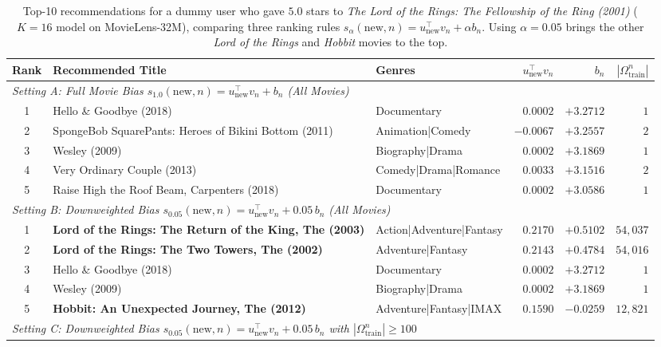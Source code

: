 \documentclass{article}
\theoremstyle{plain}
\theoremstyle{definition}
\begin{document}
\begin{table}[t]
\caption{Top-10 recommendations for a dummy user who gave $5.0$ stars to \emph{The Lord of the Rings: The Fellowship of the Ring (2001)} ($K=16$ model on MovieLens-32M), comparing three ranking rules $s_\alpha(\text{new}, n) = u_{\text{new}}^\top v_n + \alpha b_n$. Using $\alpha=0.05$ brings the other \emph{Lord of the Rings} and \emph{Hobbit} movies to the top.}
\label{tab:dummy_user_lotr}
\vskip 0.1in
\begin{center}
\begin{small}
\setlength{\tabcolsep}{4pt}
\begin{tabular}{cllrrr}
\toprule
\textbf{Rank} & \textbf{Recommended Title} & \textbf{Genres} & $u_{\text{new}}^\top v_n$ & $b_n$ & $|\Omega_{\text{train}}^n|$ \\
\midrule
\multicolumn{6}{l}{\emph{Setting A: Full Movie Bias $s_{1.0}(\text{new}, n) = u_{\text{new}}^\top v_n + b_n$ (All Movies)}} \\
1 & Hello \& Goodbye (2018) & Documentary & $0.0002$ & $+3.2712$ & $1$ \\
2 & SpongeBob SquarePants: Heroes of Bikini Bottom (2011) & Animation|Comedy & $-0.0067$ & $+3.2557$ & $2$ \\
3 & Wesley (2009) & Biography|Drama & $0.0002$ & $+3.1869$ & $1$ \\
4 & Very Ordinary Couple (2013) & Comedy|Drama|Romance & $0.0033$ & $+3.1516$ & $2$ \\
5 & Raise High the Roof Beam, Carpenters (2018) & Documentary & $0.0002$ & $+3.0586$ & $1$ \\
\midrule
\multicolumn{6}{l}{\emph{Setting B: Downweighted Bias $s_{0.05}(\text{new}, n) = u_{\text{new}}^\top v_n + 0.05\,b_n$ (All Movies)}} \\
1 & \textbf{Lord of the Rings: The Return of the King, The (2003)} & Action|Adventure|Fantasy & $0.2170$ & $+0.5102$ & $54,037$ \\
2 & \textbf{Lord of the Rings: The Two Towers, The (2002)} & Adventure|Fantasy & $0.2143$ & $+0.4784$ & $54,016$ \\
3 & Hello \& Goodbye (2018) & Documentary & $0.0002$ & $+3.2712$ & $1$ \\
4 & Wesley (2009) & Biography|Drama & $0.0002$ & $+3.1869$ & $1$ \\
5 & \textbf{Hobbit: An Unexpected Journey, The (2012)} & Adventure|Fantasy|IMAX & $0.1590$ & $-0.0259$ & $12,821$ \\
\midrule
\multicolumn{6}{l}{\emph{Setting C: Downweighted Bias $s_{0.05}(\text{new}, n) = u_{\text{new}}^\top v_n + 0.05\,b_n$ with $|\Omega_{\text{train}}^n| \ge 100$}} \\

\end{tabular}
\end{small}
\end{center}
\end{table}
\end{document}
